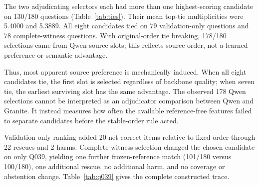 \documentclass[applsci,article,submit,moreauthors]{Definitions/mdpi}
\begin{document}
The two adjudicating selectors each had more than one highest-scoring candidate on 130/180 questions (Table~\ref{tab:ties}). Their mean top-tie multiplicities were 5.4000 and 5.3889. All eight candidates tied on 79 validation-only questions and 78 complete-witness questions. With original-order tie breaking, 178/180 selections came from Qwen source slots; this reflects source order, not a learned preference or semantic advantage.

Thus, most apparent source preference is mechanically induced. When all eight candidates tie, the first slot is selected regardless of backbone quality; when seven tie, the earliest surviving slot has the same advantage. The observed 178 Qwen selections cannot be interpreted as an adjudicator comparison between Qwen and Granite. It instead measures how often the available reference-free features failed to separate candidates before the stable-order rule acted.

\begin{table}[htbp]
\caption{Complete top-score tie diagnostic for the two adjudicating selectors. Multiplicity distributions are reported as ``tie size:number of questions''.}
\label{tab:ties}
\centering
\small
{}
\end{table}

Validation-only ranking added 20 net correct items relative to fixed order through 22 rescues and 2 harms. Complete-witness selection changed the chosen candidate on only Q039, yielding one further frozen-reference match (101/180 versus 100/180), one additional rescue, no additional harm, and no coverage or abstention change. Table~\ref{tab:q039} gives the complete constructed trace.
\end{document}
